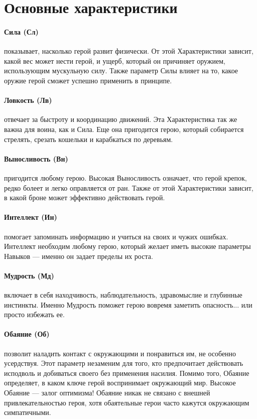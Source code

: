 \section{Основные характеристики}
\paragraph{Сила (Сл)} показывает, насколько герой развит физически. От этой Характеристики зависит, какой вес может нести герой, и ущерб, который он причиняет оружием, использующим мускульную силу. Также параметр Силы влияет на то, какое оружие герой сможет успешно применить в принципе.
\paragraph{Ловкость (Лв)} отвечает за быстроту и координацию движений. Эта Характеристика так же важна для воина, как и Сила. Еще она пригодится герою, который собирается стрелять, срезать кошельки и карабкаться по деревьям.
\paragraph{Выносливость (Вн)} пригодится любому герою. Высокая Выносливость означает, что герой крепок, редко болеет и легко оправляется от ран. Также от этой Характеристики зависит, в какой броне может эффективно действовать герой.
\paragraph{Интеллект (Ин)} помогает запоминать информацию и учиться на своих и чужих ошибках. Интеллект необходим любому герою, который желает иметь высокие параметры Навыков — именно он задает пределы их роста.
\paragraph{Мудрость (Мд)} включает в себя находчивость, наблюдательность, здравомыслие и глубинные инстинкты. Именно Мудрость поможет герою вовремя заметить опасность... или просто избежать ее.
\paragraph{Обаяние (Об)} позволит наладить контакт с окружающими и понравиться им, не особенно усердствуя. Этот параметр незаменим для того, кто предпочитает действовать исподволь и добиваться своего без применения насилия. Помимо того, Обаяние определяет, в каком ключе герой воспринимает окружающий мир. Высокое Обаяние — залог оптимизма! Обаяние никак не связано с внешней привлекательностью героя, хотя обаятельные герои часто кажутся окружающим симпатичными.
